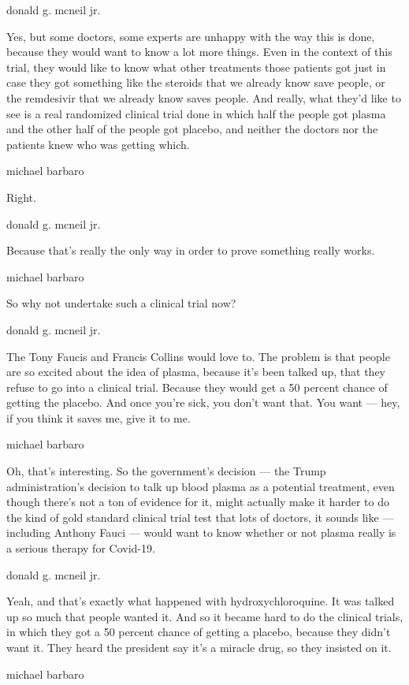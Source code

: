 donald g. mcneil jr.

Yes, but some doctors, some experts are unhappy with the way this is
done, because they would want to know a lot more things. Even in the
context of this trial, they would like to know what other treatments
those patients got just in case they got something like the steroids
that we already know save people, or the remdesivir that we already know
saves people. And really, what they'd like to see is a real randomized
clinical trial done in which half the people got plasma and the other
half of the people got placebo, and neither the doctors nor the patients
knew who was getting which.

michael barbaro

Right.

donald g. mcneil jr.

Because that's really the only way in order to prove something really
works.

michael barbaro

So why not undertake such a clinical trial now?

donald g. mcneil jr.

The Tony Faucis and Francis Collins would love to. The problem is that
people are so excited about the idea of plasma, because it's been talked
up, that they refuse to go into a clinical trial. Because they would get
a 50 percent chance of getting the placebo. And once you're sick, you
don't want that. You want --- hey, if you think it saves me, give it to
me.

michael barbaro

Oh, that's interesting. So the government's decision --- the Trump
administration's decision to talk up blood plasma as a potential
treatment, even though there's not a ton of evidence for it, might
actually make it harder to do the kind of gold standard clinical trial
test that lots of doctors, it sounds like --- including Anthony Fauci
--- would want to know whether or not plasma really is a serious therapy
for Covid-19.

donald g. mcneil jr.

Yeah, and that's exactly what happened with hydroxychloroquine. It was
talked up so much that people wanted it. And so it became hard to do the
clinical trials, in which they got a 50 percent chance of getting a
placebo, because they didn't want it. They heard the president say it's
a miracle drug, so they insisted on it.

michael barbaro

